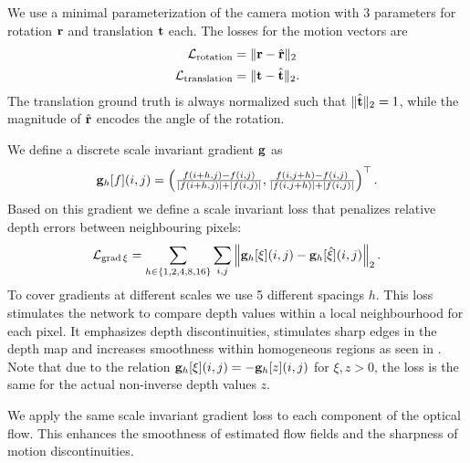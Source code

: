 \documentclass[10pt,twocolumn,letterpaper]{article}
\begin{document}
We use a minimal parameterization of the camera motion with 3 parameters for rotation $\mathbf{r}$ and translation $\mathbf{t}$ each.
The losses for the motion vectors are
\begin{equation}
\begin{aligned}
\mathcal{L}_\text{rotation} &= \Vert \mathbf{r} - \hat{\mathbf{r}} \Vert_2 \\
\mathcal{L}_\text{translation} &= \Vert \mathbf{t} - \hat{\mathbf{t}} \Vert_2.
\end{aligned}
\end{equation}
The translation ground truth is always normalized such that $\Vert \hat{\mathbf{t}} \Vert_2 = 1$, while the magnitude of $\hat{\mathbf{r}}$ encodes the angle of the rotation.

We define a discrete scale invariant gradient $\mathbf{g}$ as
\begin{equation}
\mathbf{g}_h[f](i,j) = \left( \tfrac{f(i+h,j) - f(i,j)}{\vert f(i+h,j) \vert + \vert f(i,j) \vert}, \tfrac{f(i,j+h) - f(i,j)}{\vert f(i,j+h) \vert + \vert f(i,j) \vert} \right)^\top.
\end{equation}
Based on this gradient we define a scale invariant loss that penalizes relative depth errors between neighbouring pixels:
\begin{equation}
\label{eq:loss_grad}
\mathcal{L}_{\text{grad}\, \xi} = \sum_{h \in \{1,2,4,8,16\}} \sum_{i,j} \left\Vert \mathbf{g}_h[\xi](i,j) - \mathbf{g}_h[\hat\xi](i,j)\right\Vert_2.
\end{equation}
To cover gradients at different scales we use 5 different spacings $h$.
This loss stimulates the network to compare depth values within a local neighbourhood for each pixel.
It emphasizes depth discontinuities, stimulates sharp edges in the depth map and increases smoothness within homogeneous regions as seen in .
Note that due to the relation $\mathbf{g}_h[\xi](i,j) = - \mathbf{g}_h[z](i,j)$ for $\xi, z > 0$, the loss is the same for the actual non-inverse depth values $z$.

We apply the same scale invariant gradient loss to each component of the optical flow.
This enhances the smoothness of estimated flow fields and the sharpness of motion discontinuities.
\end{document}
